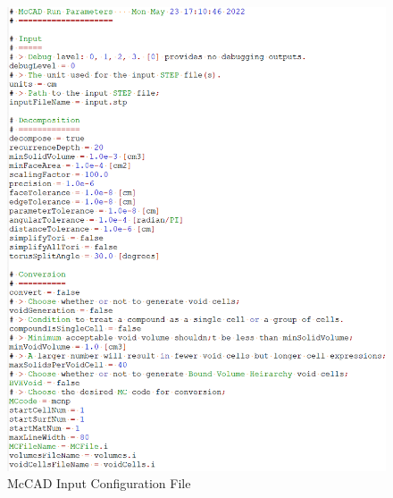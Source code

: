 \documentclass[12pt, a4paper, titlepage]{article}
\begin{document}
	\begin{figure}[h!]
		\centering
		\includegraphics[scale=0.6]{figures/configFile.png}
		\caption{McCAD Input Configuration File}
		\label{fig:config}
	\end{figure}
\end{document}
